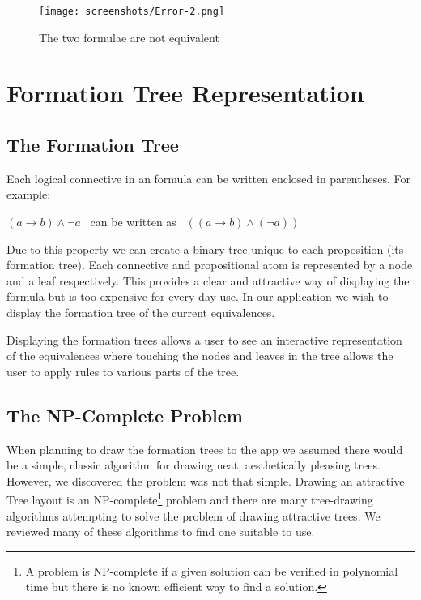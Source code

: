 \documentclass{report}
\begin{document}
\begin{figure}[ht!]
    \centering
    \texttt{[image: screenshots/Error-2.png]}
    \caption{The two formulae are not equivalent}
    \label{error2}
\end{figure}

\section{Formation Tree Representation}
\label{sec:formation_tree_representation}

\subsection{The Formation Tree}

Each logical connective in an formula can be written enclosed in parentheses. For example:

\begin{center}
$(a\to b)\land \neg a$ \ can be written as \ $((a\to b)\land (\neg a))$
\end{center}

Due to this property we can create a binary tree unique to each proposition (its formation tree). Each connective and propositional atom is represented by a node and a leaf respectively. This provides a clear and attractive way of displaying the formula but is too expensive for every day use. In our application we wish to display the formation tree of the current equivalences.

Displaying the formation trees allows a user to see an interactive representation of the equivalences where touching the nodes and leaves in the tree allows the user to apply rules to various parts of the tree.

\subsection{The NP-Complete Problem}

When planning to draw the formation trees to the app we assumed there would be a simple, classic algorithm for drawing neat, aesthetically pleasing trees. However, we discovered the problem was not that simple. Drawing an attractive Tree layout is an NP-complete\footnote{A problem is NP-complete if a given solution can be verified in polynomial time but there is no known efficient way to find a solution. } problem\cite{npcompletetrees} and there are many tree-drawing algorithms attempting to solve the problem of drawing attractive trees. We reviewed many of these algorithms to find one suitable to use.
\end{document}
